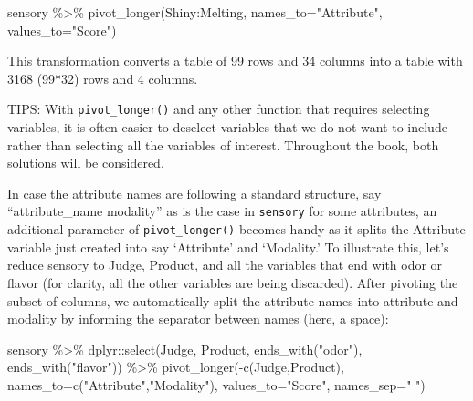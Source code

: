 \documentclass[
]{book}
\newenvironment{Shaded}{\begin{snugshade}}{\end{snugshade}}
\newcommand{\AttributeTok}[1]{\textcolor[rgb]{0.77,0.63,0.00}{#1}}
\newcommand{\FunctionTok}[1]{\textcolor[rgb]{0.00,0.00,0.00}{#1}}
\newcommand{\NormalTok}[1]{#1}
\newcommand{\SpecialCharTok}[1]{\textcolor[rgb]{0.00,0.00,0.00}{#1}}
\newcommand{\StringTok}[1]{\textcolor[rgb]{0.31,0.60,0.02}{#1}}
\begin{document}
\begin{Shaded}
\begin{Highlighting}[]
\NormalTok{sensory }\SpecialCharTok{\%\textgreater{}\%} 
  \FunctionTok{pivot\_longer}\NormalTok{(Shiny}\SpecialCharTok{:}\NormalTok{Melting, }\AttributeTok{names\_to=}\StringTok{"Attribute"}\NormalTok{, }\AttributeTok{values\_to=}\StringTok{"Score"}\NormalTok{)}
\end{Highlighting}
\end{Shaded}

This transformation converts a table of 99 rows and 34 columns into a table with 3168 (99*32) rows and 4 columns.

TIPS: With \texttt{pivot\_longer()} and any other function that requires selecting variables, it is often easier to deselect variables that we do not want to include rather than selecting all the variables of interest. Throughout the book, both solutions will be considered.

In case the attribute names are following a standard structure, say ``attribute\_name modality'' as is the case in \texttt{sensory} for some attributes, an additional parameter of \texttt{pivot\_longer()} becomes handy as it splits the Attribute variable just created into say `Attribute' and `Modality.' To illustrate this, let's reduce sensory to Judge, Product, and all the variables that end with odor or flavor (for clarity, all the other variables are being discarded). After pivoting the subset of columns, we automatically split the attribute names into attribute and modality by informing the separator between names (here, a space):

\begin{Shaded}
\begin{Highlighting}[]
\NormalTok{sensory }\SpecialCharTok{\%\textgreater{}\%} 
\NormalTok{  dplyr}\SpecialCharTok{::}\FunctionTok{select}\NormalTok{(Judge, Product, }\FunctionTok{ends\_with}\NormalTok{(}\StringTok{"odor"}\NormalTok{), }\FunctionTok{ends\_with}\NormalTok{(}\StringTok{"flavor"}\NormalTok{)) }\SpecialCharTok{\%\textgreater{}\%} 
  \FunctionTok{pivot\_longer}\NormalTok{(}\SpecialCharTok{{-}}\FunctionTok{c}\NormalTok{(Judge,Product), }\AttributeTok{names\_to=}\FunctionTok{c}\NormalTok{(}\StringTok{"Attribute"}\NormalTok{,}\StringTok{"Modality"}\NormalTok{), }\AttributeTok{values\_to=}\StringTok{"Score"}\NormalTok{, }\AttributeTok{names\_sep=}\StringTok{" "}\NormalTok{)}
\end{Highlighting}
\end{Shaded}
\end{document}
